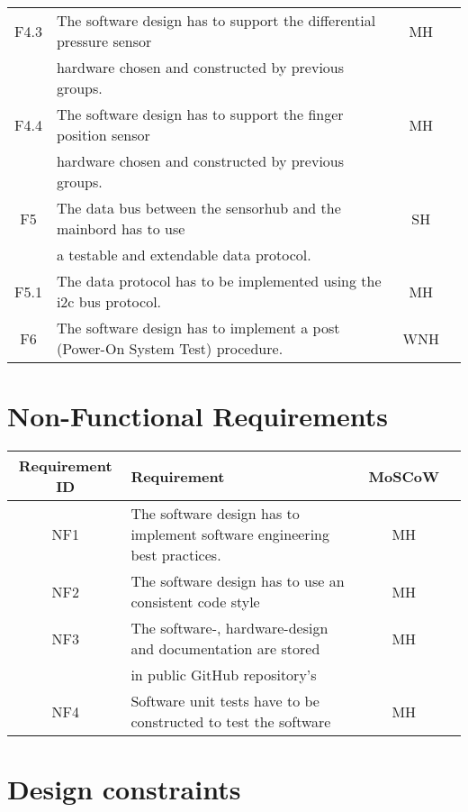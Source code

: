 \begin{tabular}{ |c|l|c|c| }
 F4.3  & The software design has to support the differential pressure sensor & MH \\
       & hardware chosen and constructed by previous groups. & \\
\hline
 F4.4  & The software design has to support the finger position sensor & MH \\
       & hardware chosen and constructed by previous groups. & \\
\hline
 F5    & The data bus between the sensorhub and the mainbord has to use & SH\\
       & a testable and extendable data protocol. &   \\
 \hline
 F5.1  & The data protocol has to be implemented using the i2c bus protocol. & MH \\
 \hline
 F6    & The software design has to implement a post (Power-On System Test) procedure. & WNH \\ 
 \hline
\end{tabular}

\section{Non-Functional Requirements}
\begin{tabular}{ |c|l|c|c| } 
 \hline
 Requirement ID & Requirement & MoSCoW \\ 
 \hline
 \hline
 NF1    & The software design has to implement software engineering best practices.  & MH \\
 \hline
 NF2    & The software design has to use an consistent code style & MH \\
 \hline 
 NF3    & The software-, hardware-design and documentation are stored  & MH \\
        & in public GitHub repository's & \\
\hline
 NF4   & Software unit tests have to be constructed to test the software & MH\\
 \hline
\end{tabular}
\section{Design constraints}
